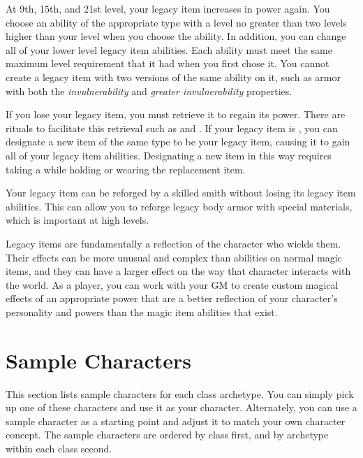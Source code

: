         At 9th, 15th, and 21st level, your legacy item increases in power again.
        You choose an ability of the appropriate type with a level no greater than two levels higher than your level when you choose the ability.
        In addition, you can change all of your lower level legacy item abilities.
        Each ability must meet the same maximum level requirement that it had when you first chose it.
        You cannot create a legacy item with two versions of the same ability on it, such as armor with both the \textit{invulnerability} and \textit{greater invulnerability} properties.

        If you lose your legacy item, you must retrieve it to regain its power.
        There are rituals to facilitate this retrieval such as  and .
        If your legacy item is , you can designate a new item of the same type to be your legacy item, causing it to gain all of your legacy item abilities.
        Designating a new item in this way requires taking a  while holding or wearing the replacement item.

        Your legacy item can be reforged by a skilled smith without losing its legacy item abilities.
        This can allow you to reforge legacy body armor with special materials, which is important at high levels.

            Legacy items are fundamentally a reflection of the character who wields them.
            Their effects can be more unusual and complex than abilities on normal magic items, and they can have a larger effect on the way that character interacts with the world.
            As a player, you can work with your GM to create custom magical effects of an appropriate power that are a better reflection of your character's personality and powers than the magic item abilities that exist.

\section{Sample Characters}

    This section lists sample characters for each class archetype.
    You can simply pick up one of these characters and use it as your character.
    Alternately, you can use a sample character as a starting point and adjust it to match your own character concept.
    The sample characters are ordered by class first, and by archetype within each class second.

